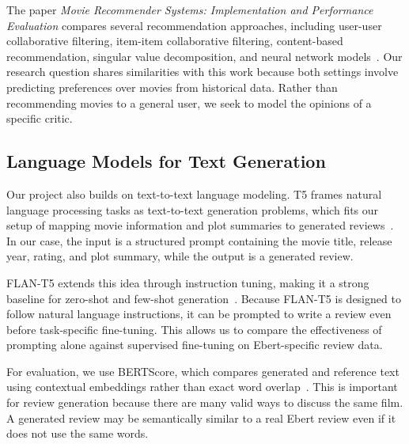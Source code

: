 The paper \textit{Movie Recommender Systems: Implementation and Performance Evaluation} compares several recommendation approaches, including user-user collaborative filtering, item-item collaborative filtering, content-based recommendation, singular value decomposition, and neural network models~\cite{recperformance}. Our research question shares similarities with this work because both settings involve predicting preferences over movies from historical data. Rather than recommending movies to a general user, we seek to model the opinions of a specific critic.

\subsection{Language Models for Text Generation}

Our project also builds on text-to-text language modeling. T5 frames natural language processing tasks as text-to-text generation problems, which fits our setup of mapping movie information and plot summaries to generated reviews~\cite{t5}. In our case, the input is a structured prompt containing the movie title, release year, rating, and plot summary, while the output is a generated review.

FLAN-T5 extends this idea through instruction tuning, making it a strong baseline for zero-shot and few-shot generation~\cite{flan}. Because FLAN-T5 is designed to follow natural language instructions, it can be prompted to write a review even before task-specific fine-tuning. This allows us to compare the effectiveness of prompting alone against supervised fine-tuning on Ebert-specific review data.

For evaluation, we use BERTScore, which compares generated and reference text using contextual embeddings rather than exact word overlap~\cite{bertscore}. This is important for review generation because there are many valid ways to discuss the same film. A generated review may be semantically similar to a real Ebert review even if it does not use the same words.
